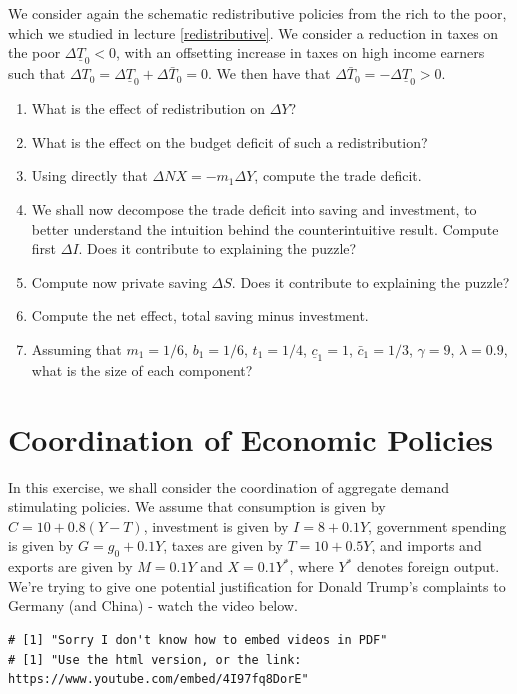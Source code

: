 \documentclass[]{book}
\begin{document}
We consider again the schematic redistributive policies from the rich to
the poor, which we studied in lecture \ref{redistributive}. We consider
a reduction in taxes on the poor \(\Delta\underline{T}_{0}<0\), with an
offsetting increase in taxes on high income earners such that
\(\Delta T_0 = \Delta\underline{T}_{0}+\Delta\bar{T}_{0}=0\). We then
have that \(\Delta\bar{T}_{0}=-\Delta\underline{T}_{0}>0\).

\begin{enumerate}
\def\labelenumi{\arabic{enumi}.}
\item
  What is the effect of redistribution on \(\Delta Y\)?
\item
  What is the effect on the budget deficit of such a redistribution?
\item
  Using directly that \(\Delta NX = -m_1 \Delta Y\), compute the trade
  deficit.
\item
  We shall now decompose the trade deficit into saving and investment,
  to better understand the intuition behind the counterintuitive result.
  Compute first \(\Delta I\). Does it contribute to explaining the
  puzzle?
\item
  Compute now private saving \(\Delta S\). Does it contribute to
  explaining the puzzle?
\item
  Compute the net effect, total saving minus investment.
\item
  Assuming that \(m_1=1/6\), \(b_1=1/6\), \(t_1=1/4\),
  \(\underline{c}_{1}=1\), \(\bar{c}_{1}=1/3\), \(\gamma=9\),
  \(\lambda=0.9\), what is the size of each component?
\end{enumerate}

\section{Coordination of Economic
Policies}\label{coordination-of-economic-policies}

In this exercise, we shall consider the coordination of aggregate demand
stimulating policies. We assume that consumption is given by
\(C = 10+0.8 (Y-T)\), investment is given by \(I=8+0.1Y\), government
spending is given by \(G = g_0 + 0.1Y\), taxes are given by
\(T = 10+0.5Y\), and imports and exports are given by \(M = 0.1Y\) and
\(X = 0.1 Y^{*}\), where \(Y^{*}\) denotes foreign output. We're trying
to give one potential justification for Donald Trump's complaints to
Germany (and China) - watch the video below.

\begin{verbatim}
# [1] "Sorry I don't know how to embed videos in PDF"
# [1] "Use the html version, or the link: https://www.youtube.com/embed/4I97fq8DorE"
\end{verbatim}
\end{document}
